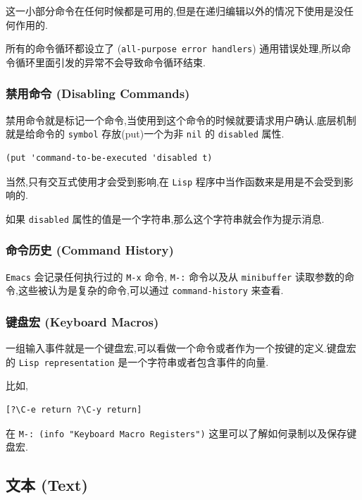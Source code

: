 \documentclass[11pt]{article}
\begin{document}
这一小部分命令在任何时候都是可用的,但是在递归编辑以外的情况下使用是没任何作用的.

所有的命令循环都设立了 (\texttt{all-purpose error handlers}) 通用错误处理,所以命令循环里面引发的异常不会导致命令循环结束.



\subsubsection{禁用命令 (Disabling Commands)}
\label{sec:orgb4875f8}

禁用命令就是标记一个命令,当使用到这个命令的时候就要请求用户确认.底层机制就是给命令的 \texttt{symbol} 存放(put)一个为非 \texttt{nil} 的 \texttt{disabled} 属性.

\begin{verbatim}
(put 'command-to-be-executed 'disabled t)
\end{verbatim}

当然,只有交互式使用才会受到影响,在 \texttt{Lisp} 程序中当作函数来是用是不会受到影响的.

如果 \texttt{disabled} 属性的值是一个字符串,那么这个字符串就会作为提示消息.


\subsubsection{命令历史 (Command History)}
\label{sec:orgab52d9c}

\texttt{Emacs} 会记录任何执行过的 \texttt{M-x} 命令, \texttt{M-:} 命令以及从 \texttt{minibuffer} 读取参数的命令,这些被认为是复杂的命令,可以通过 \texttt{command-history} 来查看.


\subsubsection{键盘宏 (Keyboard Macros)}
\label{sec:org91cf659}

一组输入事件就是一个键盘宏,可以看做一个命令或者作为一个按键的定义.键盘宏的 \texttt{Lisp representation} 是一个字符串或者包含事件的向量.

比如,

\begin{verbatim}
[?\C-e return ?\C-y return]
\end{verbatim}

在 \texttt{M-: (info "Keyboard Macro Registers")} 这里可以了解如何录制以及保存键盘宏.


\subsection{文本 (Text)}
\label{sec:orgf06aaa9}
\end{document}
